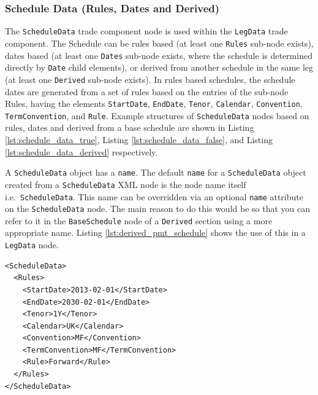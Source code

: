 \subsubsection{Schedule Data (Rules, Dates and Derived)}\label{ss:schedule_data}

The \lstinline!ScheduleData! trade component node is used within the \lstinline!LegData! trade component. The Schedule can be
rules based (at least one \lstinline!Rules! sub-node exists), dates based (at least one \lstinline!Dates! sub-node exists, where
the schedule is determined directly by \lstinline!Date! child elements), or derived from another schedule in the same leg
(at least one \lstinline!Derived! sub-node exists). In rules based schedules, the schedule dates are generated from a
set of rules based on the entries of the sub-node Rules, having the elements \lstinline!StartDate!, \lstinline!EndDate!, 
\lstinline!Tenor!, \lstinline!Calendar!, \lstinline!Convention!, \lstinline!TermConvention!, and \lstinline!Rule!.
Example structures of \lstinline!ScheduleData! nodes based on rules, dates and derived from a base schedule are shown in
Listing \ref{lst:schedule_data_true}, Listing \ref{lst:schedule_data_false}, and Listing \ref{lst:schedule_data_derived}
respectively.

A \lstinline!ScheduleData! object has a \lstinline!name!. The default \lstinline!name! for a \lstinline!ScheduleData! 
object created from a \lstinline!ScheduleData! XML node is the node name itself i.e.\ \lstinline!ScheduleData!. This 
name can be overridden via an optional \lstinline!name! attribute on the \lstinline!ScheduleData! node. The main 
reason to do this would be so that you can refer to it in the \lstinline!BaseSchedule! node of a \lstinline!Derived! 
section using a more appropriate name. Listing \ref{lst:derived_pmt_schedule} shows the use of this in a 
\lstinline!LegData! node.

\begin{listing}[H]
\begin{verbatim}
<ScheduleData>
  <Rules>
    <StartDate>2013-02-01</StartDate>
    <EndDate>2030-02-01</EndDate>
    <Tenor>1Y</Tenor>
    <Calendar>UK</Calendar>
    <Convention>MF</Convention>
    <TermConvention>MF</TermConvention>
    <Rule>Forward</Rule>
  </Rules>
</ScheduleData>
\end{verbatim}
\caption{Schedule data, rules based}
\label{lst:schedule_data_true}
\end{listing}

